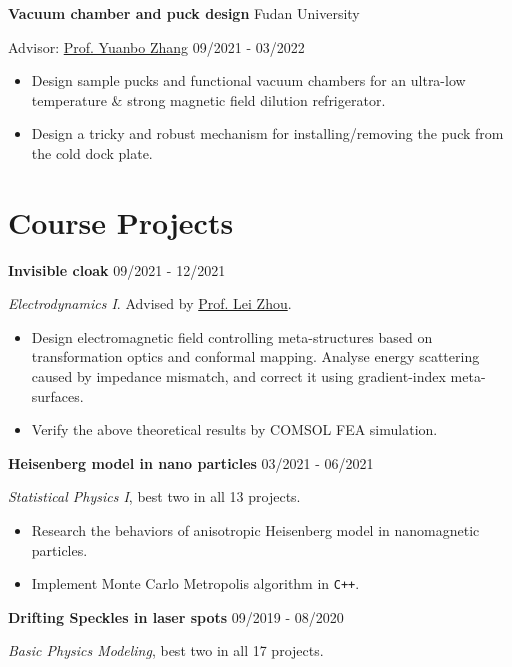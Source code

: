\documentclass[11pt]{article} %
\begin{document}
\textbf{Vacuum chamber and puck design}
\hfill Fudan University

Advisor: \href{https://scholar.google.com/citations?user=IdLAVPsAAAAJ}{Prof. Yuanbo Zhang}
\hfill 09/2021 - 03/2022

\begin{itemize}
    \item Design sample pucks and functional vacuum chambers for an ultra-low temperature \& strong magnetic field dilution refrigerator.
    \item Design a tricky and robust mechanism for installing/removing the puck from the cold dock plate.
\end{itemize}




\section*{Course Projects}

\textbf{Invisible cloak}
\hfill 09/2021 - 12/2021

{\itshape Electrodynamics I}. Advised by \href{https://scholar.google.com/citations?user=4x9SoV0AAAAJ}{Prof. Lei Zhou}.

\begin{itemize}
    \item Design electromagnetic field controlling meta-structures based on transformation optics and conformal mapping. Analyse energy scattering caused by impedance mismatch, and correct it using gradient-index meta-surfaces.
    \item Verify the above theoretical results by COMSOL FEA simulation.
\end{itemize}


\textbf{Heisenberg model in nano particles}
\hfill 03/2021 - 06/2021

{\itshape Statistical Physics I}, best two in all 13 projects.

\begin{itemize}
    \item Research the behaviors of anisotropic Heisenberg model in nanomagnetic particles.
    \item Implement Monte Carlo Metropolis algorithm in \verb|C++|.
\end{itemize}

\textbf{Drifting Speckles in laser spots}
\hfill 09/2019 - 08/2020

{\itshape Basic Physics Modeling}, best two in all 17 projects.
\end{document}
